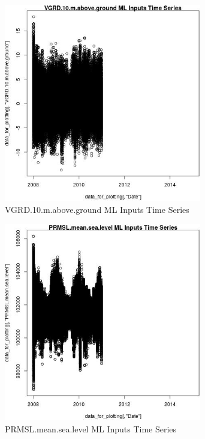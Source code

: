 \begin{figure} 
\centering  
\includegraphics[width=0.77\textwidth]{Code_Outputs/ML_input_report_ML_input_PM25_Step5_part_d_de_duplicated_aves_ML_input_VGRD.10.m.above.groundTS.jpg} 
\caption{\label{fig:ML_input_report_ML_input_PM25_Step5_part_d_de_duplicated_aves_ML_inputVGRD.10.m.above.groundTS}VGRD.10.m.above.ground ML Inputs Time Series} 
\end{figure} 
 

\begin{figure} 
\centering  
\includegraphics[width=0.77\textwidth]{Code_Outputs/ML_input_report_ML_input_PM25_Step5_part_d_de_duplicated_aves_ML_input_PRMSL.mean.sea.levelTS.jpg} 
\caption{\label{fig:ML_input_report_ML_input_PM25_Step5_part_d_de_duplicated_aves_ML_inputPRMSL.mean.sea.levelTS}PRMSL.mean.sea.level ML Inputs Time Series} 
\end{figure} 
 

